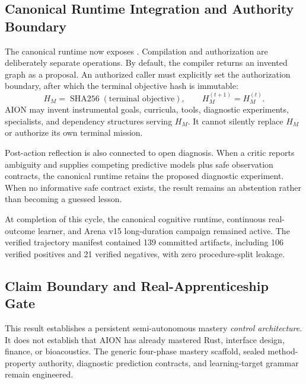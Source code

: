 \subsection{Canonical Runtime Integration and Authority Boundary}
\label{subsec:mastery-runtime-integration}

The canonical runtime now exposes
.  Compilation and authorization
are deliberately separate operations.  By default, the compiler returns an
invented graph as a proposal.  An authorized caller must explicitly set the
authorization boundary, after which the terminal objective hash is immutable:
\begin{equation}
H_M=\operatorname{SHA256}(\text{terminal objective}),
\qquad
H_M^{(t+1)}=H_M^{(t)}.
\label{eq:immutable-owner-objective}
\end{equation}
AION may invent instrumental goals, curricula, tools, diagnostic experiments,
specialists, and dependency structures serving $H_M$.  It cannot silently
replace $H_M$ or authorize its own terminal mission.

Post-action reflection is also connected to open diagnosis.  When a critic
reports ambiguity and supplies competing predictive models plus safe
observation contracts, the canonical runtime retains the proposed diagnostic
experiment.  When no informative safe contract exists, the result remains an
abstention rather than becoming a guessed lesson.

At completion of this cycle, the canonical cognitive runtime, continuous
real-outcome learner, and Arena v15 long-duration campaign remained active.
The verified trajectory manifest contained 139 committed artifacts, including
106 verified positives and 21 verified negatives, with zero procedure-split
leakage.

\subsection{Claim Boundary and Real-Apprenticeship Gate}

This result establishes a persistent semi-autonomous mastery \emph{control
architecture}.  It does not establish that AION has already mastered Rust,
interface design, finance, or bioacoustics.  The generic four-phase mastery
scaffold, sealed method-property authority, diagnostic prediction contracts,
and learning-target grammar remain engineered.

